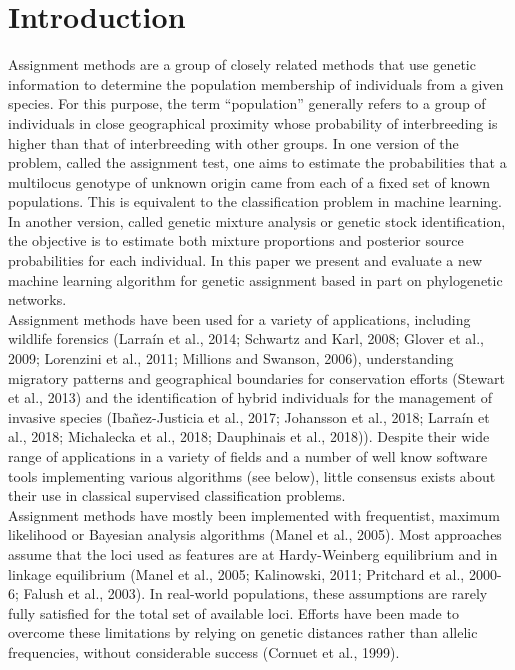 \documentclass[final]{bioinfo}
\begin{document}
\maketitle

\section{Introduction}

Assignment methods are a group of closely related methods that use genetic information to determine the population membership of individuals from a given species. For this purpose, the term “population” generally refers to a group of individuals in close geographical proximity whose probability of interbreeding is higher than that of interbreeding with other groups. In one version of the problem, called the assignment test, one aims to estimate the probabilities that a multilocus genotype of unknown origin came from each of a fixed set of known populations. This is equivalent to the classification problem in machine learning. In another version, called genetic mixture analysis or genetic stock identification, the objective is to estimate both mixture proportions and posterior source probabilities for each individual. In this paper we present and evaluate a new machine learning algorithm for genetic assignment based in part on phylogenetic networks.\\
Assignment methods have been used for a variety of applications, including wildlife forensics (Larraín et al., 2014; Schwartz and Karl, 2008; Glover et al., 2009; Lorenzini et al., 2011; Millions and Swanson, 2006), understanding migratory patterns and geographical boundaries for conservation efforts (Stewart et al., 2013) and the identification of hybrid individuals for the management of invasive species (Ibañez-Justicia et al., 2017; Johansson et al., 2018; Larraín et al., 2018; Michalecka et al., 2018; Dauphinais et al., 2018)). Despite their wide range of applications in a variety of fields and a number of well know software tools implementing various algorithms (see below), little consensus exists about their use in classical supervised classification problems. \\
Assignment methods have mostly been implemented with frequentist, maximum likelihood or Bayesian analysis algorithms (Manel et al., 2005). Most  approaches assume that the loci used as features are at Hardy-Weinberg equilibrium and in linkage equilibrium (Manel et al., 2005; Kalinowski, 2011; Pritchard et al., 2000-6; Falush et al., 2003). In real-world populations, these assumptions are rarely fully satisfied for the total set of available loci. Efforts have been made to overcome these limitations by relying on genetic distances rather than allelic frequencies, without considerable success (Cornuet et al., 1999).\\
\end{document}
